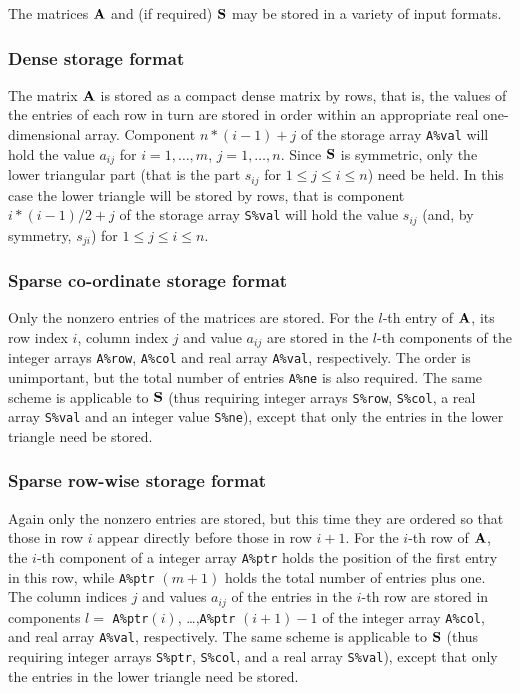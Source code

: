 \documentclass{galahad}
\begin{document}

\galmatrix
The matrices ${\mathbf{A}}$ and (if required) ${\mathbf{S}}$
may be stored in a variety of input formats.

\subsubsection{Dense storage format}\label{dense}
The matrix ${\mathbf{A}}$ is stored as a compact
dense matrix by rows, that is, the values of the entries of each row in turn are
stored in order within an appropriate real one-dimensional array.
Component $n \ast (i-1) + j$ of the storage array {\tt A\%val} will hold the
value $a_{ij}$ for $i = 1, \ldots , m$, $j = 1, \ldots , n$.
Since ${\mathbf{S}}$ is symmetric, only the lower triangular part (that is the part
$s_{ij}$ for $1 \leq j \leq i \leq n$) need be held. In this case
the lower triangle will be stored by rows, that is
component $i \ast (i-1)/2 + j$ of the storage array {\tt S\%val}
will hold the value $s_{ij}$ (and, by symmetry, $s_{ji}$)
for $1 \leq j \leq i \leq n$.

\subsubsection{Sparse co-ordinate storage format}\label{coordinate}
Only the nonzero entries of the matrices are stored. For the
$l$-th entry of ${\mathbf{A}}$, its row index $i$, column index $j$
and value $a_{ij}$
are stored in the $l$-th components of the integer arrays {\tt A\%row},
{\tt A\%col} and real array {\tt A\%val}, respectively.
The order is unimportant, but the total
number of entries {\tt A\%ne} is also required.
The same scheme is applicable to
${\mathbf{S}}$ (thus requiring integer arrays {\tt S\%row}, {\tt S\%col}, a real array
{\tt S\%val} and an integer value {\tt S\%ne}),
except that only the entries in the lower triangle need be stored.

\subsubsection{Sparse row-wise storage format}\label{rowwise}
Again only the nonzero entries are stored, but this time
they are ordered so that those in row $i$ appear directly before those
in row $i+1$. For the $i$-th row of ${\mathbf{A}}$, the $i$-th component of a
integer array {\tt A\%ptr} holds the position of the first entry in this row,
while {\tt A\%ptr} $(m+1)$ holds the total number of entries plus one.
The column indices $j$ and values $a_{ij}$ of the entries in the $i$-th row
are stored in components
$l =$ {\tt A\%ptr}$(i)$, \ldots ,{\tt A\%ptr} $(i+1)-1$ of the
integer array {\tt A\%col}, and real array {\tt A\%val}, respectively.
The same scheme is applicable to
${\mathbf{S}}$ (thus requiring integer arrays {\tt S\%ptr}, {\tt S\%col}, and
a real array {\tt S\%val}),
except that only the entries in the lower triangle need be stored.
\end{document}
